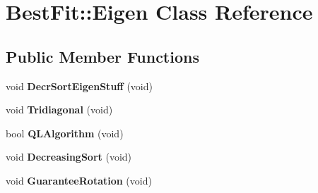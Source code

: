 \hypertarget{class_best_fit_1_1_eigen}{\section{Best\+Fit\+:\+:Eigen Class Reference}
\label{class_best_fit_1_1_eigen}
}
\subsection*{Public Member Functions}
\begin{DoxyCompactItemize}
\item 
\hypertarget{class_best_fit_1_1_eigen_abae32659d68ffd85877fc5a6af64cf97}{void {\bfseries Decr\+Sort\+Eigen\+Stuff} (void)}\label{class_best_fit_1_1_eigen_abae32659d68ffd85877fc5a6af64cf97}

\item 
\hypertarget{class_best_fit_1_1_eigen_af168c539588e1add6abe5589b80e2103}{void {\bfseries Tridiagonal} (void)}\label{class_best_fit_1_1_eigen_af168c539588e1add6abe5589b80e2103}

\item 
\hypertarget{class_best_fit_1_1_eigen_ad7264d6ca9a5cc9a69d225992b616923}{bool {\bfseries Q\+L\+Algorithm} (void)}\label{class_best_fit_1_1_eigen_ad7264d6ca9a5cc9a69d225992b616923}

\item 
\hypertarget{class_best_fit_1_1_eigen_a63c0032bb33b796557da0a2665a02c21}{void {\bfseries Decreasing\+Sort} (void)}\label{class_best_fit_1_1_eigen_a63c0032bb33b796557da0a2665a02c21}

\item 
\hypertarget{class_best_fit_1_1_eigen_a3b0c9ce7be24ed9af5c1060557b6b6a1}{void {\bfseries Guarantee\+Rotation} (void)}\label{class_best_fit_1_1_eigen_a3b0c9ce7be24ed9af5c1060557b6b6a1}

\end{DoxyCompactItemize}
